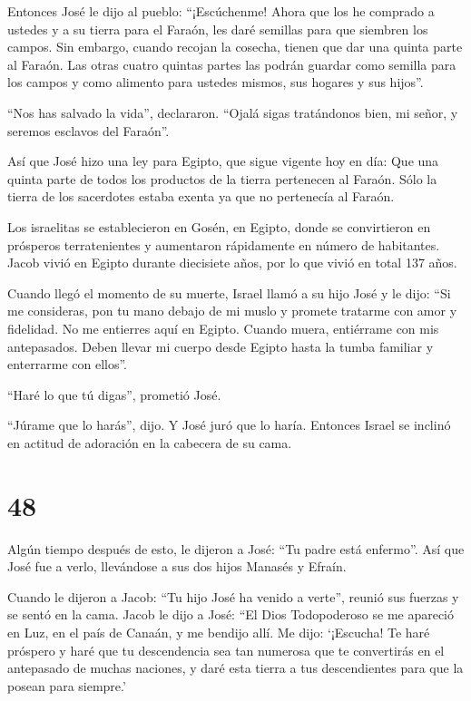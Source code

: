  Entonces José le dijo al pueblo: ``¡Escúchenme! Ahora que
los he comprado a ustedes y a su tierra para el Faraón, les daré
semillas para que siembren los campos.  Sin embargo, cuando
recojan la cosecha, tienen que dar una quinta parte al Faraón. Las otras
cuatro quintas partes las podrán guardar como semilla para los campos y
como alimento para ustedes mismos, sus hogares y sus hijos''.

 ``Nos has salvado la vida'', declararon. ``Ojalá sigas
tratándonos bien, mi señor, y seremos esclavos del Faraón''.

 Así que José hizo una ley para Egipto, que sigue vigente
hoy en día: Que una quinta parte de todos los productos de la tierra
pertenecen al Faraón. Sólo la tierra de los sacerdotes estaba exenta ya
que no pertenecía al Faraón.

 Los israelitas se establecieron en Gosén, en Egipto, donde
se convirtieron en prósperos terratenientes y aumentaron rápidamente en
número de habitantes.  Jacob vivió en Egipto durante
diecisiete años, por lo que vivió en total 137 años.

 Cuando llegó el momento de su muerte, Israel llamó a su
hijo José y le dijo: ``Si me consideras, pon tu mano debajo de mi muslo
y promete tratarme con amor y fidelidad. No me entierres aquí en Egipto.
 Cuando muera, entiérrame con mis antepasados. Deben llevar
mi cuerpo desde Egipto hasta la tumba familiar y enterrarme con ellos''.

``Haré lo que tú digas'', prometió José.

 ``Júrame que lo harás'', dijo. Y José juró que lo haría.
Entonces Israel se inclinó en actitud de adoración en la cabecera de su
cama.

\hypertarget{section-47}{%
\section{48}\label{section-47}}

 Algún tiempo después de esto, le dijeron a José: ``Tu padre
está enfermo''. Así que José fue a verlo, llevándose a sus dos hijos
Manasés y Efraín.

 Cuando le dijeron a Jacob: ``Tu hijo José ha venido a
verte'', reunió sus fuerzas y se sentó en la cama.  Jacob le
dijo a José: ``El Dios Todopoderoso se me apareció en Luz, en el país de
Canaán, y me bendijo allí.  Me dijo: `¡Escucha! Te haré
próspero y haré que tu descendencia sea tan numerosa que te convertirás
en el antepasado de muchas naciones, y daré esta tierra a tus
descendientes para que la posean para siempre.'

